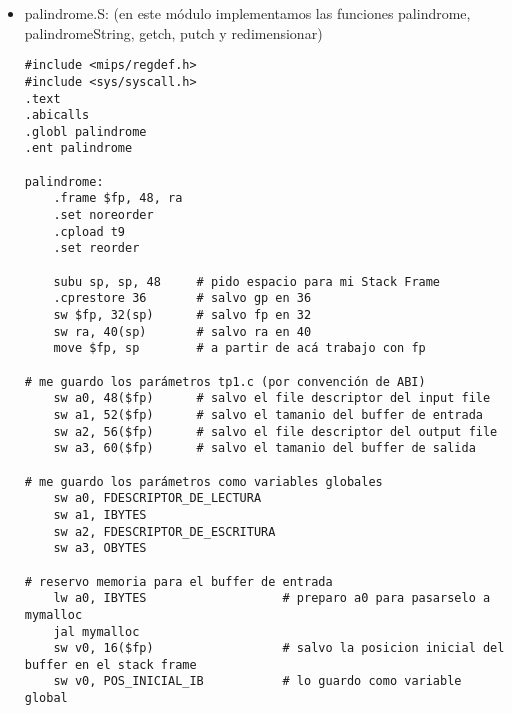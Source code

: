 \documentclass[a4paper,10pt]{article}
\begin{document}
\begin{itemize}
\begin{verbatim}
  if (verificarParametrosInvalidos(argc, argv)){
	return mostrarMensajeErrorParametrosInvalidos();
  }
	//ESTO FUE UNA PRUEBA PARA VER SI ANDABA Todo.
  input_fileName = seIngresoParametro_io("-i", argc, argv);
  output_fileName = seIngresoParametro_io("-o", argc, argv);
  bufferIn = seIngresoParametro_buf("-I", argc, argv);
  bufferOut = seIngresoParametro_buf("-O", argc, argv);
  FILE* input_file = NULL;
  FILE* output_file = NULL;
  if (aperturaDeArchivos(input_fileName, &input_file, output_fileName, &output_file) 
  																			== -1) {
  	if (fprintf(stderr, "Alguno de los archivos ingresados no pudo ser abierto.\n") 
  																				< 0){
	fprintf(stderr, "Fallo en la ejecucion de la funcion fprintf o printf");
	}
  	return -1;
  }
  int ifd = fileno(input_file);
  int ofd = fileno(output_file);

  palindrome(ifd, bufferIn, ofd, bufferOut); //ACA LLAMAMOS A LA FUNCION PALINDROME
  																			 DE MIPS
  fclose(input_file);
  fclose(output_file);
  return 0;
}


\end{verbatim}
\item palindrome.S: (en este módulo implementamos las funciones palindrome, palindromeString, getch, putch y redimensionar) \\
\begin{verbatim}
#include <mips/regdef.h>
#include <sys/syscall.h>
.text
.abicalls
.globl palindrome
.ent palindrome

palindrome:
	.frame $fp, 48, ra
	.set noreorder
	.cpload t9
	.set reorder

	subu sp, sp, 48 	# pido espacio para mi Stack Frame
	.cprestore 36		# salvo gp en 36
	sw $fp, 32(sp)		# salvo fp en 32
	sw ra, 40(sp)		# salvo ra en 40
	move $fp, sp		# a partir de acá trabajo con fp
	
# me guardo los parámetros tp1.c (por convención de ABI)
	sw a0, 48($fp)		# salvo el file descriptor del input file
	sw a1, 52($fp)		# salvo el tamanio del buffer de entrada
	sw a2, 56($fp)		# salvo el file descriptor del output file
	sw a3, 60($fp)		# salvo el tamanio del buffer de salida

# me guardo los parámetros como variables globales
	sw a0, FDESCRIPTOR_DE_LECTURA
	sw a1, IBYTES
	sw a2, FDESCRIPTOR_DE_ESCRITURA
	sw a3, OBYTES

# reservo memoria para el buffer de entrada
	lw a0, IBYTES					# preparo a0 para pasarselo a mymalloc
	jal mymalloc
	sw v0, 16($fp)					# salvo la posicion inicial del buffer en el stack frame
	sw v0, POS_INICIAL_IB 			# lo guardo como variable global


\end{verbatim}
\end{itemize}
\end{document}

